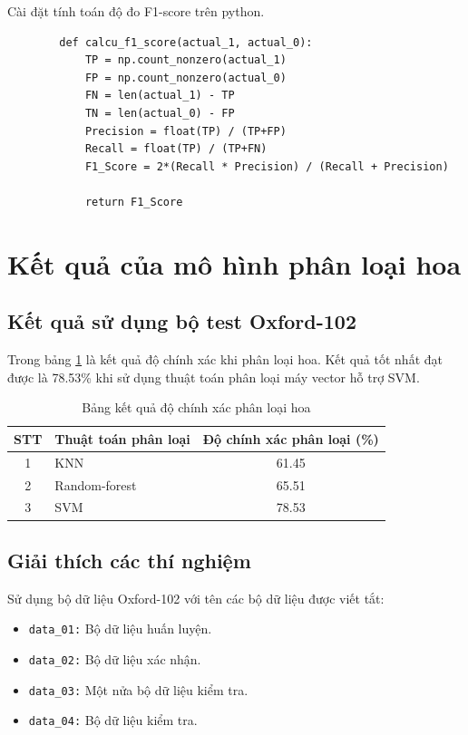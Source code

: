 \documentclass[12pt]{report}
\begin{document}
		Cài đặt tính toán độ đo F1-score trên python.
		\begin{lstlisting}
		def calcu_f1_score(actual_1, actual_0):
			TP = np.count_nonzero(actual_1)
			FP = np.count_nonzero(actual_0)
			FN = len(actual_1) - TP
			TN = len(actual_0) - FP
			Precision = float(TP) / (TP+FP)
			Recall = float(TP) / (TP+FN)
			F1_Score = 2*(Recall * Precision) / (Recall + Precision)

			return F1_Score
		\end{lstlisting}
		
				
				
				
		\section{Kết quả của mô hình phân loại hoa}
		\subsection{Kết quả sử dụng bộ test Oxford-102}
		Trong bảng \ref{tbl:table ket qua phan loai hoa} là kết quả độ chính xác khi phân loại hoa.
		Kết quả tốt nhất đạt được là 78.53\% khi sử dụng thuật toán phân loại máy vector hỗ trợ SVM.

		


		\begin{table}[h]
			\centering
			\caption{Bảng kết quả độ chính xác phân loại hoa}
			\label{tbl:table ket qua phan loai hoa}
			\begin{tabular}{|c|l|c|}
				\hline
				\textbf{STT} & \textbf{Thuật toán phân loại} & \textbf{Độ chính xác phân loại (\%)} \\ \hline
				1            & KNN                                 & 61.45                                        \\ \hline
				2            & Random-forest                       & 65.51                                        \\ \hline
				3            & SVM                                 & 78.53                                        \\ \hline
			\end{tabular}
		\end{table}
				
		\subsection{Giải thích các thí nghiệm}
		Sử dụng bộ dữ liệu Oxford-102 với tên các bộ dữ liệu được viết tắt:
		\begin{itemize}
			\item \texttt{data\_01:} Bộ dữ liệu huấn luyện.
			\item \texttt{data\_02:} Bộ dữ liệu xác nhận.
			\item \texttt{data\_03:} Một nửa bộ dữ liệu kiểm tra.
			\item \texttt{data\_04:} Bộ dữ liệu kiểm tra.
		\end{itemize}
				
\end{document}

